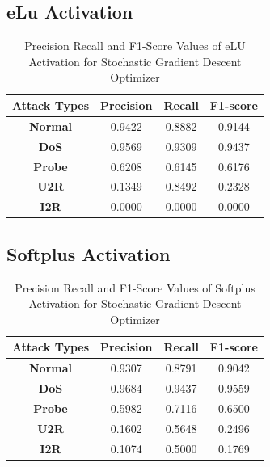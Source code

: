 \documentclass[12pt, a4paper]{report}
\begin{document}
\begin{appendices}
	\subsection{eLu Activation}
 	  \begin{table}[h]
		\centering
		\captionsetup{justification=centering,margin=2cm}
		\begin{tabular}{|c|c|c|c|}
		\hline
		\textbf{Attack Types} & \textbf{Precision} & \textbf{Recall} & \textbf{F1-score} \\ \hline
		\textbf{Normal}       & 0.9422             & 0.8882          & 0.9144            \\ \hline
		\textbf{DoS}          & 0.9569             & 0.9309          & 0.9437            \\ \hline
		\textbf{Probe}        & 0.6208             & 0.6145          & 0.6176            \\ \hline
		\textbf{U2R}          & 0.1349             & 0.8492          & 0.2328            \\ \hline
		\textbf{I2R}          & 0.0000             & 0.0000          & 0.0000            \\ \hline
		\end{tabular}
		\caption{Precision Recall and F1-Score Values of eLU Activation for Stochastic Gradient Descent Optimizer}
		\label{classification elu sgd tflearn}
		\end{table} 
	\clearpage
	\subsection{Softplus Activation}
 	  \begin{table}[h]
		\centering
		\captionsetup{justification=centering,margin=2cm}
		\begin{tabular}{|c|c|c|c|}
		\hline
		\textbf{Attack Types} & \textbf{Precision} & \textbf{Recall} & \textbf{F1-score} \\ \hline
		\textbf{Normal}       & 0.9307             & 0.8791          & 0.9042            \\ \hline
		\textbf{DoS}          & 0.9684             & 0.9437          & 0.9559            \\ \hline
		\textbf{Probe}        & 0.5982             & 0.7116          & 0.6500            \\ \hline
		\textbf{U2R}          & 0.1602             & 0.5648          & 0.2496            \\ \hline
		\textbf{I2R}          & 0.1074             & 0.5000          & 0.1769            \\ \hline
		\end{tabular}
		\caption{Precision Recall and F1-Score Values of Softplus Activation for Stochastic Gradient Descent Optimizer}
		\label{classification softplus sgd tflearn}
		\end{table} 
		

\end{appendices}
\end{document}

